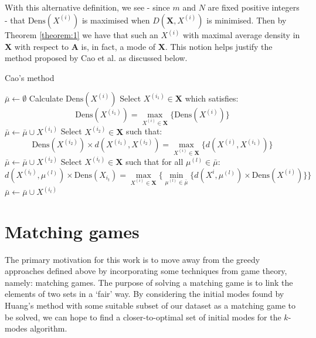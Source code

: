 \documentclass{article}
\theoremstyle{definition}
\begin{document}
With this alternative definition, we see - since \(m\) and \(N\) are fixed 
positive integers - that \(\text{Dens}(X^{(i)})\) is maximised when 
\(D(\textbf{X}, X^{(i)})\) is minimised. Then by Theorem \ref{theorem:1} we have
that such an \(X^{(i)}\) with maximal average density in \textbf{X} with respect
to \textbf{A} is, in fact, a mode of \textbf{X}. This notion helps justify the 
method proposed by Cao et al. as discussed below.\\

\begin{algorithm}[H]
\caption{Cao's method}\label{alg:cao}
	\begin{algorithmic}[0]
        \State \(\bar{\mu} \gets \emptyset\)
            \State Calculate \(\text{Dens}(X^{(i)})\)
		\EndFor
        \State Select \(X^{(i_1)} \in \textbf{X}\) which satisfies:
        \[
            \text{Dens}(X^{(i_1)}) = \max_{X^{(i)} \in \textbf{X}} 
            \{\text{Dens}(X^{(i)})\}
        \]
        \State \(\bar{\mu} \gets \bar{\mu} \cup X^{(i_1)}\)
        \State Select \(X^{(i_2)} \in \textbf{X}\) such that: 
		\[
			\text{Dens}(X^{(i_2)}) \times d(X^{(i_1)}, X^{(i_2)}) =
			\max_{X^{(i)} \in \textbf{X}} \{d(X^{(i)}, X^{(i_1)})\}
		\]
        \State \(\bar{\mu} \gets \bar{\mu} \cup X^{(i_2)}\)
            \State Select \(X^{(i_t)} \in \textbf{X}\) such that for all 
                \(\mu^{(l)} \in \bar{\mu}\):
			\[
		        d(X^{(i_t)}, \mu^{(l)}) \times \text{Dens}(X_{i_t}) = 
                \max_{X^{(i)} \in \textbf{X}} \{\min_{\mu^{(l)} \in \bar{\mu}} 
				\{d(X^{i}, \mu^{(l)}) \times \text{Dens}(X^{(i)}) \}\}
			\]
            \State \(\bar{\mu} \gets \bar{\mu} \cup X^{(i_t)}\)
		\EndWhile
	\end{algorithmic}
\end{algorithm}

\section{Matching games}\label{section:matching}

The primary motivation for this work is to move away from the greedy approaches
defined above by incorporating some techniques from game theory, namely:
matching games. The purpose of solving a matching game is to link the elements
of two sets in a `fair' way. By considering the initial modes found by Huang's 
method with some suitable subset of our dataset as a matching game to be solved, 
we can hope to find a closer-to-optimal set of initial modes for the \(k\)-modes 
algorithm.
\end{document}
